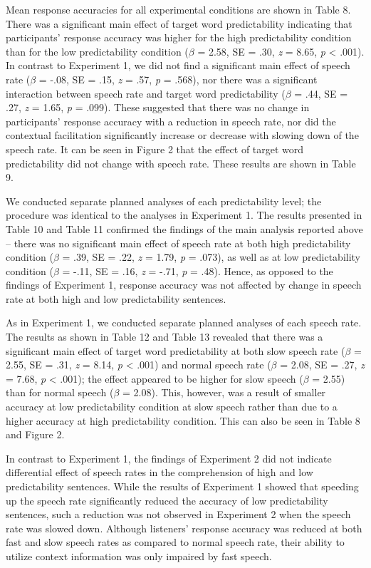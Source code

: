 \documentclass[a4paper, nobind]{templates/ociamthesis}
\begin{document}
Mean response accuracies for all experimental conditions are shown in Table 8.
There was a significant main effect of target word predictability indicating that participants' response accuracy was higher for the high predictability condition than for the low predictability condition (\(\beta\) = 2.58, SE = .30, \emph{z} = 8.65, \emph{p} \textless{} .001).
In contrast to Experiment 1, we did not find a significant main effect of speech rate (\(\beta\) = -.08, SE = .15, \emph{z} = .57, \emph{p} = .568), nor there was a significant interaction between speech rate and target word predictability (\(\beta\) = .44, SE = .27, \emph{z} = 1.65, \emph{p} = .099).
These suggested that there was no change in participants' response accuracy with a reduction in speech rate, nor did the contextual facilitation significantly increase or decrease with slowing down of the speech rate.
It can be seen in Figure 2 that the effect of target word predictability did not change with speech rate.
These results are shown in Table 9.

We conducted separate planned analyses of each predictability level; the procedure was identical to the analyses in Experiment 1.
The results presented in Table 10 and Table 11 confirmed the findings of the main analysis reported above -- there was no significant main effect of speech rate at both high predictability condition (\(\beta\) = .39, SE = .22, \emph{z} = 1.79, \emph{p} = .073), as well as at low predictability condition (\(\beta\) = -.11, SE = .16, \emph{z} = -.71, \emph{p} = .48).
Hence, as opposed to the findings of Experiment 1, response accuracy was not affected by change in speech rate at both high and low predictability sentences.

As in Experiment 1, we conducted separate planned analyses of each speech rate.
The results as shown in Table 12 and Table 13 revealed that there was a significant main effect of target word predictability at both slow speech rate (\(\beta\) = 2.55, SE = .31, \emph{z} = 8.14, \emph{p} \textless{} .001) and normal speech rate (\(\beta\) = 2.08, SE = .27, \emph{z} = 7.68, \emph{p} \textless{} .001);
the effect appeared to be higher for slow speech (\(\beta\) = 2.55) than for normal speech (\(\beta\) = 2.08).
This, however, was a result of smaller accuracy at low predictability condition at slow speech rather than due to a higher accuracy at high predictability condition. This can also be seen in Table 8 and Figure 2.

In contrast to Experiment 1, the findings of Experiment 2 did not indicate differential effect of speech rates in the comprehension of high and low predictability sentences.
While the results of Experiment 1 showed that speeding up the speech rate significantly reduced the accuracy of low predictability sentences, such a reduction was not observed in Experiment 2 when the speech rate was slowed down.
Although listeners' response accuracy was reduced at both fast and slow speech rates as compared to normal speech rate, their ability to utilize context information was only impaired by fast speech.
\end{document}
